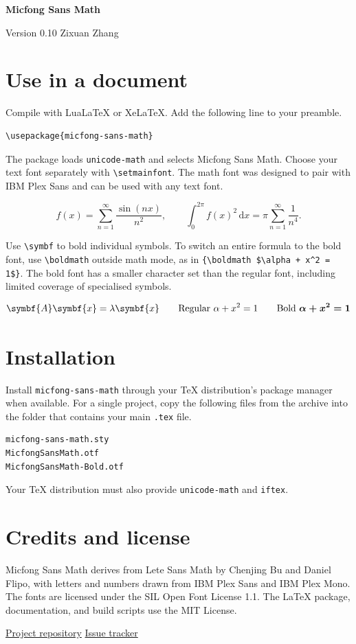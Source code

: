 \documentclass[11pt]{article}
\begin{document}
{\LARGE\bfseries Micfong Sans Math}\par
Version 0.10 \hfill Zixuan Zhang

\section*{Use in a document}

Compile with LuaLaTeX or XeLaTeX. Add the following line to your preamble.

\begin{verbatim}
\usepackage{micfong-sans-math}
\end{verbatim}

The package loads \texttt{unicode-math} and selects Micfong Sans Math.
Choose your text font separately with \verb|\setmainfont|. The math font was
designed to pair with IBM Plex Sans and can be used with any text font.

\[
  f(x) = \sum_{n=1}^{\infty} \frac{\sin(nx)}{n^2},
  \qquad \int_0^{2\pi} f(x)^2\,\mathrm{d}x
    = \pi \sum_{n=1}^{\infty} \frac{1}{n^4}.
\]

Use \verb|\symbf| to bold individual symbols. To switch an entire formula to
the bold font, use \verb|\boldmath| outside math mode, as in
\verb|{\boldmath $\alpha + x^2 = 1$}|. The bold font has a smaller character
set than the regular font, including limited coverage of specialised symbols.

\[
  \symbf{A} \symbf{x} = \lambda \symbf{x}
  \qquad
  \text{Regular } \alpha + x^2 = 1
  \qquad
  \text{Bold } \text{\boldmath$\alpha + x^2 = 1$}
\]

\section*{Installation}

Install \texttt{micfong-sans-math} through your TeX distribution's package
manager when available. For a single project, copy the following files from
the archive into the folder that contains your main \texttt{.tex} file.

\begin{verbatim}
micfong-sans-math.sty
MicfongSansMath.otf
MicfongSansMath-Bold.otf
\end{verbatim}

Your TeX distribution must also provide \texttt{unicode-math} and \texttt{iftex}.

\section*{Credits and license}

Micfong Sans Math derives from Lete Sans Math by Chenjing Bu and Daniel Flipo,
with letters and numbers drawn from IBM Plex Sans and IBM Plex Mono.
The fonts are licensed under the SIL Open Font License 1.1. The LaTeX package,
documentation, and build scripts use the MIT License.

\href{https://github.com/micfong-z/micfong-sans-math}{Project repository}
\quad
\href{https://github.com/micfong-z/micfong-sans-math/issues}{Issue tracker}
\end{document}
